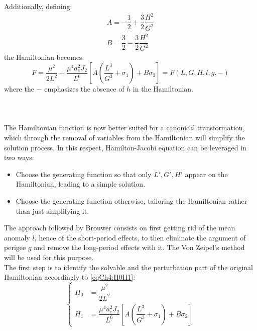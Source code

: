 		\indent Additionally, defining:
		\[
		\begin{array}{ll}
		A = -\dfrac{1}{2} + \dfrac{3}{2} \dfrac{H^2}{G^2}\\[1.2em]
		B = \dfrac{3}{2} - \dfrac{3}{2} \dfrac{H^2}{G^2}
		\end{array}
		\]
		\noindent the Hamiltonian becomes:
		\begin{equation}
		F = \dfrac{\mu^2}{2L^2} + \dfrac{\mu^4 a_e^2 J_2}{L^6} \left[ A \left(\dfrac{L^3}{G^3} + \sigma_1\right) + B\sigma_2\right] = F(L, G, H, l, g, -)
		\end{equation}
		\noindent where the $-$ emphasizes the absence of $h$ in the Hamiltonian.
		\paragraph{  \\}
		\indent The Hamiltonian function is now better suited for a canonical transformation, which through the removal of variables from the Hamiltonian will simplify the solution process. In this respect, Hamilton-Jacobi equation can be leveraged in two ways:
		\begin{itemize}
		\item[\GMVred{A.}] Choose the generating function so that only $L', G', H'$ appear on the Hamiltonian, leading to a simple solution.
		\item[\GMVred{B.}] Choose the generating function otherwise, tailoring the Hamiltonian rather than just simplifying it.
		\end{itemize}
		\indent The approach followed by Brouwer consists on first getting rid of the mean anomaly $l$, hence of the short-period effects, to then eliminate the argument of perigee $g$ and remove the long-period effects with it. The Von Zeipel's method will be used for this purpose.\\
		\indent The first step is to identify the solvable and the perturbation part of the original Hamiltonian accordingly to \eqref{eqCh4:H0H1}:
		\begin{equation}
		\left\{\begin{array}{ll}
		\nonumber H_0 & = \dfrac{\mu^2}{2 L^2} \\[1.2em]
		\nonumber H_1  & = \dfrac{\mu^4 a_e^2 J_2}{L^6} \left[ A \left(\dfrac{L^3}{G^3} + \sigma_1\right) + B\sigma_2\right]
		\end{array}\right.
		\label{eqCh4:H0H1_V500}
		\end{equation}
